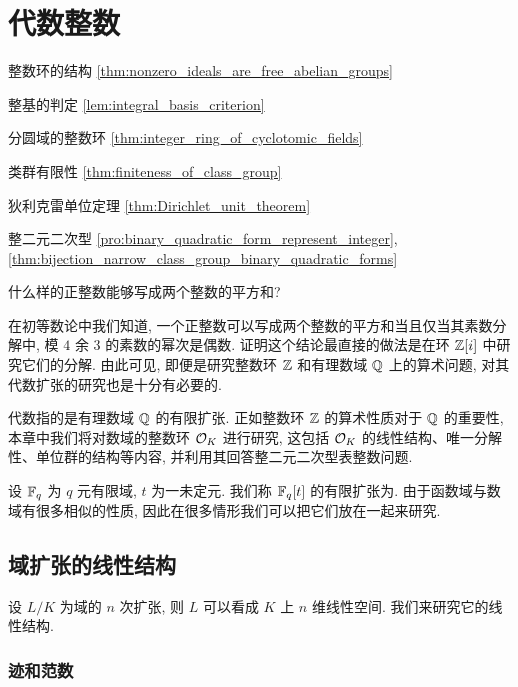 \chapter{代数整数}
\begin{introduction}
\item 整数环的结构 \ref{thm:nonzero_ideals_are_free_abelian_groups}
\item 整基的判定 \ref{lem:integral_basis_criterion}
\item 分圆域的整数环 \ref{thm:integer_ring_of_cyclotomic_fields}
\item 类群有限性 \ref{thm:finiteness_of_class_group}
\item 狄利克雷单位定理 \ref{thm:Dirichlet_unit_theorem}
\item 整二元二次型 \ref{pro:binary_quadratic_form_represent_integer}, \ref{thm:bijection_narrow_class_group_binary_quadratic_forms}
\end{introduction}

\begin{question*}{}
什么样的正整数能够写成两个整数的平方和?
\end{question*}


在初等数论中我们知道, 一个正整数可以写成两个整数的平方和当且仅当其素数分解中, 模 $4$ 余 $3$ 的素数的幂次是偶数. 证明这个结论最直接的做法是在环 ${\mathbb{Z}}[i]$ 中研究它们的分解. 由此可见, 即便是研究整数环 ${\mathbb{Z}}$ 和有理数域 ${\mathbb{Q}}$ 上的算术问题, 对其代数扩张的研究也是十分有必要的.

代数指的是有理数域 ${\mathbb{Q}}$ 的有限扩张. 正如整数环 ${\mathbb{Z}}$ 的算术性质对于 ${\mathbb{Q}}$ 的重要性, 本章中我们将对数域的整数环 ${\mathcal{O}}_K$ 进行研究, 这包括 ${\mathcal{O}}_K$ 的线性结构、唯一分解性、单位群的结构等内容, 并利用其回答整二元二次型表整数问题.

设 ${\mathbb{F}}_q$ 为 $q$ 元有限域, $t$ 为一未定元. 我们称 ${\mathbb{F}}_q[t]$ 的有限扩张为.
由于函数域与数域有很多相似的性质, 因此在很多情形我们可以把它们放在一起来研究.

\section{域扩张的线性结构}

设 $L/K$ 为域的 $n$ 次扩张, 则 $L$ 可以看成 $K$ 上 $n$ 维线性空间. 我们来研究它的线性结构.

\subsection{迹和范数}

